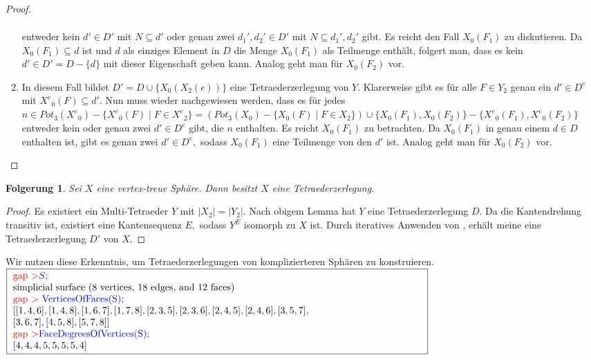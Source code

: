 \documentclass[12pt,titlepage,twoside,cleardoublepage]{article}
\theoremstyle{nummermitklammern}
\newtheorem{folgerung}[temp]{Folgerung}
\newtheorem{bsp}[temp]{Beispiel}
\newtheorem{folgerung}[zahl]{Folgerung}
\newtheorem{bsp}[zahl]{Beispiel}
\numberwithin{equation}{section}
\begin{document}
\begin{proof}
\begin{enumerate}
\begin{align*}
 \end{align*}
  entweder kein $d'\in D'$ mit $N\subseteq d'$ 
  oder genau zwei $d_1',d_2'\in D'$ mit $N\subseteq d_1',d_2'$ gibt. 
  Es reicht den Fall $X_0(F_1)$ zu diskutieren. Da $X_0(F_1)\subseteq d$ ist und $d$ als einziges Element in $D$ die Menge $X_0(F_1)$ als Teilmenge enthält, folgert man, dass es kein $d'\in D'=D-\{d\}$ mit dieser Eigenschaft geben kann. Analog geht man für $X_0(F_2) $ vor.
\item In diesem Fall bildet $D'=D\cup\{X_0(X_2(e))\}$ eine Tetraederzerlegung von $Y.$ Klarerweise gibt es für alle $F\in {Y}_2$ genau ein $d'\in D^e$ mit ${X^e}_0(F)\subseteq d'.$ Nun muss wieder nachgewiesen werden, dass es für jedes $n\in Pot_3({X^e}_0)-\{{X^e}_0(F)\mid F\in {X^e}_2\}=(Pot_3({X}_0)-\{{X}_0(F)\mid F\in {X}_2\})\cup \{X_0(F_1),X_0(F_2)\}-\{{X^e}_0(F_1),{X^e}_0(F_2)\}$ entweder kein oder genau zwei $d'\in D^e$ gibt, die $n$ enthalten. Es reicht $X_0(F_1)$ zu betrachten. Da $X_0(F_1)$ in genau einem $d\in D$ enthalten ist, gibt es genau zwei $d'\in D^e,$ sodass $X_0(F_1)$ eine Teilmenge von den $d'$ ist. Analog geht man für $X_0(F_2) $ vor.
\end{enumerate}
\end{proof}
\begin{folgerung}
Sei $X$ eine vertex-treue Sphäre. Dann besitzt $X$ eine Tetraederzerlegung.
\end{folgerung}
\begin{proof}
Es existiert ein Multi-Tetraeder $Y$ mit $\vert X_2\vert =\vert Y_2 \vert .$ Nach obigem Lemma hat $Y$ eine Tetraederzerlegung $D$. Da die Kantendrehung transitiv ist, existiert eine Kantensequenz $E,$ sodass $Y^E$ isomorph zu $X$ ist. Durch iteratives Anwenden von , erhält meine eine Tetraederzerlegung $D'$ von $X$. 
\end{proof}
Wir nutzen diese Erkenntnis, um Tetraederzerlegungen von komplizierteren Sphären zu konstruieren.\newline
$\fbox{
\parbox{15cm}{
\textcolor{red}{gap $>$}\textcolor{blue}{$S;$}\\
simplicial surface (8 vertices, 18 edges, and 12 faces)\\
\textcolor{red}{gap $>$} \textcolor{blue}{VerticesOfFaces(S);}\\
$[ [ 1, 4, 6 ], [ 1, 4, 8 ], [ 1, 6, 7 ], [ 1, 7, 8 ], [ 2, 3, 5 ],
[ 2, 3, 6 ], [ 2, 4, 5 ], [ 2, 4, 6 ], [ 3, 5, 7 ],$\newline
$ [ 3, 6, 7 ],
[ 4, 5, 8 ], [ 5, 7, 8 ] ]$\newline
\textcolor{red}{gap $>$}\textcolor{blue}{ FaceDegreesOfVertices(S);}\\
$[ 4, 4, 4, 5, 5, 5, 5, 4 ]$
 }}$\\
\end{document}
